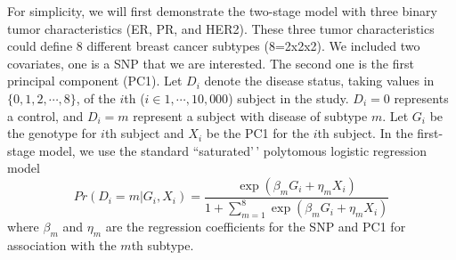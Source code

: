 \documentclass[11pt,]{article}
\begin{document}
For simplicity, we will first demonstrate the two-stage model with three
binary tumor characteristics (ER, PR, and HER2). These three tumor
characteristics could define 8 different breast cancer subtypes
(8=2x2x2). We included two covariates, one is a SNP that we are
interested. The second one is the first principal component (PC1). Let
\(D_{i}\) denote the disease status, taking values in
\(\{0,1,2,\cdots,8\}\), of the \(i\)th (\(i \in 1, \cdots, 10,000\))
subject in the study. \(D_{i}=0\) represents a control, and \(D_{i}=m\)
represent a subject with disease of subtype \(m\). Let \(G_i\) be the
genotype for \(i\)th subject and \(X_i\) be the PC1 for the \(i\)th
subject. In the first-stage model, we use the standard ``saturated'\,'
polytomous logistic regression model
\[ Pr(D_{i}=m|G_i,X_{i})=\frac{\exp(\beta_m G_i+\eta_m X_i)}{1+\sum_{m=1}^{8}\exp(\beta_m G_i+\eta_{m}X_{i})}\]
where \(\beta_{m}\) and \(\eta_{m}\) are the regression coefficients for
the SNP and PC1 for association with the \(m\)th subtype.
\end{document}
